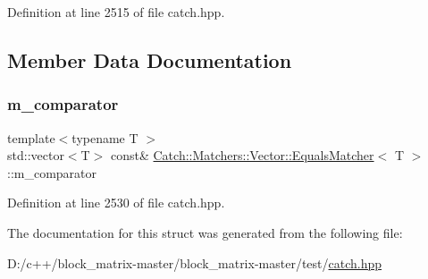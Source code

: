 Definition at line 2515 of file catch.\+hpp.



\subsection{Member Data Documentation}
\mbox{\label{struct_catch_1_1_matchers_1_1_vector_1_1_equals_matcher_a56f7aa6f110a12b1b9aeb0cabbc9d755}} 
\subsubsection{\texorpdfstring{m\+\_\+comparator}{m\_comparator}}
{\footnotesize\ttfamily template$<$typename T $>$ \\
std\+::vector$<$T$>$ const\& \mbox{\hyperlink{struct_catch_1_1_matchers_1_1_vector_1_1_equals_matcher}{Catch\+::\+Matchers\+::\+Vector\+::\+Equals\+Matcher}}$<$ T $>$\+::m\+\_\+comparator}



Definition at line 2530 of file catch.\+hpp.



The documentation for this struct was generated from the following file\+:\begin{DoxyCompactItemize}
\item 
D\+:/c++/block\+\_\+matrix-\/master/block\+\_\+matrix-\/master/test/\mbox{\hyperlink{catch_8hpp}{catch.\+hpp}}\end{DoxyCompactItemize}
